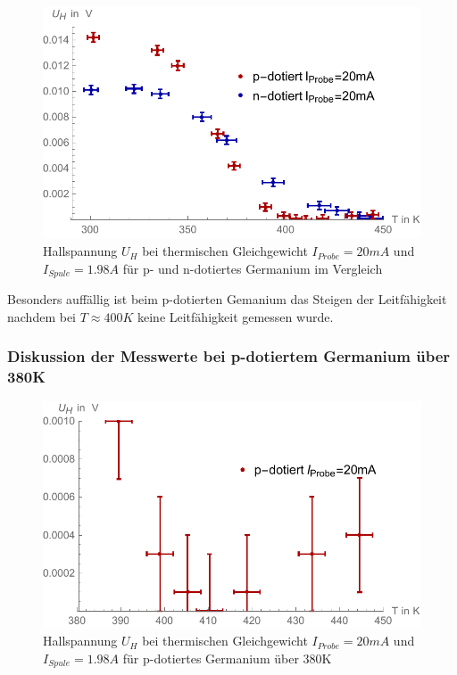 \begin{figure}[H]
	\centering
\includegraphics[width=0.9\linewidth]{IMAGE/M33_np.pdf}
	\caption{Hallspannung $U_{H}$ bei thermischen Gleichgewicht $I_{Probe}=20mA$ und $I_{Spule}=1.98A$ für p- und n-dotiertes Germanium im Vergleich}
	\label{fig:M3_3_1}
\end{figure} 

Besonders auffällig ist beim p-dotierten Gemanium das Steigen der Leitfähigkeit nachdem bei $T \approx 400K$ keine Leitfähigkeit gemessen wurde.\\

\subsubsection{Diskussion der Messwerte bei p-dotiertem Germanium über 380K}

\begin{figure}[H]
	\centering
\includegraphics[width=0.9\linewidth]{IMAGE/M33_p_gleichgewicht_zoom.pdf}
	\caption{Hallspannung $U_{H}$ bei thermischen Gleichgewicht $I_{Probe}=20mA$ und $I_{Spule}=1.98A$ für p-dotiertes Germanium über 380K}
	\label{fig:M3_Dis_2}
\end{figure} 

